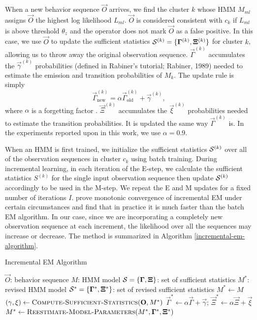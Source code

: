 When a new behavior sequence $\vec{O}$ arrives, we find the cluster
$k$ whose HMM $M_{ml}$ assigns $\vec{O}$ the highest log likelihood
$L_{ml}$. $\vec{O}$ is considered consistent with $c_k$ if $L_{ml}$ is
above threshold $\theta_z$ and the operator does not mark $\vec{O}$ as
a false positive.  In this case, we use $\vec{O}$ to update the
sufficient statistics ${\cal S}^{(k)} = \{ \vec{\Gamma}^{(k)},
\vec{\Xi}^{(k)} \}$ for cluster $k$, allowing us to throw away the
original observation sequence.  $\vec{\Gamma}^{(k)}$ accumulates the
$\vec{\gamma}^{(k)}$ probabilities (defined in Rabiner's tutorial;
Rabiner, 1989\nocite{rabiner89hmm}) needed to estimate the emission
and transition probabilities of $M_k$.  The update rule is simply
\[
  \vec{\Gamma}_{\text{new}}^{(k)} = \alpha
  \vec{\Gamma}_{\text{old}}^{(k)} + \vec{\gamma}^{(k)},
\]
where $\alpha$ is a forgetting factor .
$\vec{\Xi}^{(k)}$ accumulates the $\vec{\xi}^{(k)}$ probabilities
needed to estimate the transition probabilities.  It is updated the
same way $\vec{\Gamma}^{(k)}$ is. In the experiments reported upon in
this work, we use $\alpha = 0.9$.

When an HMM is first trained, we initialize the sufficient statistics
${\cal S}^{(k)}$ over all of the observation sequences in cluster
$c_k$ using batch training. During incremental learning, in each
iteration of the E-step, we calculate the sufficient statistics
$S^{(k)}$ for the single input observation sequence then update ${\cal
S}^{(k)}$ accordingly to be used in the M-step.  We repeat the E and M
updates for a fixed number of iterations $I$. 
prove monotonic convergence of incremental EM under certain
circumstances and find that in practice it is much faster than the
batch EM algorithm. In our case, since we are incorporating a
completely new observation sequence at each increment, the likelihood
over all the sequences may increase or decrease.  The method is
summarized in Algorithm \ref{incremental-em-algorithm}.

\begin{algorithm}[t]
  \caption{Incremental EM Algorithm}
  \label{incremental-em-algorithm}
  \begin{algorithmic}
    \REQUIRE $\vec{O}$: behavior sequence
    \REQUIRE $M$: HMM model
    \REQUIRE ${\cal S} = \{ \vec{\Gamma}, \vec{\Xi} \}$: set of sufficient statistics
    \ENSURE $M^*$: revised HMM model
    \ENSURE ${\cal S}^* = \{ \vec{\Gamma}^*, \vec{\Xi}^* \}$: set of revised sufficient statistics
    \STATE $M^* \gets M$
      \STATE {}
      \STATE $(\vec{\gamma}, \vec{\xi}) \gets \textsc{Compute-Sufficient-Statistics}(\vec{O}, M^*)$
      \STATE $\vec{\Gamma}^* \gets \alpha \vec{\Gamma} + \vec{\gamma}$; \;
      $\vec{\Xi}^* \gets \alpha \vec{\Xi} + \vec{\xi}$
      \STATE {}
      \STATE $M^* \gets \textsc{Reestimate-Model-Parameters}(M^*, \vec{\Gamma}^*, \vec{\Xi}^*)$
    \ENDFOR
  \end{algorithmic}
\end{algorithm}

